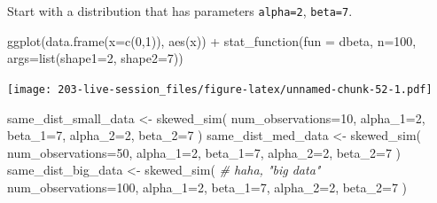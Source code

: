 \documentclass[
]{book}
\newenvironment{Shaded}{\begin{snugshade}}{\end{snugshade}}
\newcommand{\AttributeTok}[1]{\textcolor[rgb]{0.77,0.63,0.00}{#1}}
\newcommand{\CommentTok}[1]{\textcolor[rgb]{0.56,0.35,0.01}{\textit{#1}}}
\newcommand{\DecValTok}[1]{\textcolor[rgb]{0.00,0.00,0.81}{#1}}
\newcommand{\FunctionTok}[1]{\textcolor[rgb]{0.00,0.00,0.00}{#1}}
\newcommand{\NormalTok}[1]{#1}
\newcommand{\OtherTok}[1]{\textcolor[rgb]{0.56,0.35,0.01}{#1}}
\newcommand{\SpecialCharTok}[1]{\textcolor[rgb]{0.00,0.00,0.00}{#1}}
\theoremstyle{definition}
\theoremstyle{definition}
\theoremstyle{definition}
\theoremstyle{definition}
\theoremstyle{remark}
\begin{document}
Start with a distribution that has parameters \texttt{alpha=2}, \texttt{beta=7}.

\begin{Shaded}
\begin{Highlighting}[]
\FunctionTok{ggplot}\NormalTok{(}\FunctionTok{data.frame}\NormalTok{(}\AttributeTok{x=}\FunctionTok{c}\NormalTok{(}\DecValTok{0}\NormalTok{,}\DecValTok{1}\NormalTok{)), }\FunctionTok{aes}\NormalTok{(x)) }\SpecialCharTok{+} 
  \FunctionTok{stat\_function}\NormalTok{(}\AttributeTok{fun =}\NormalTok{ dbeta, }\AttributeTok{n=}\DecValTok{100}\NormalTok{, }\AttributeTok{args=}\FunctionTok{list}\NormalTok{(}\AttributeTok{shape1=}\DecValTok{2}\NormalTok{, }\AttributeTok{shape2=}\DecValTok{7}\NormalTok{))}
\end{Highlighting}
\end{Shaded}

\texttt{[image: 203-live-session\_files/figure-latex/unnamed-chunk-52-1.pdf]}

\begin{Shaded}
\begin{Highlighting}[]
\NormalTok{same\_dist\_small\_data }\OtherTok{\textless{}{-}} \FunctionTok{skewed\_sim}\NormalTok{(}
  \AttributeTok{num\_observations=}\DecValTok{10}\NormalTok{, }
  \AttributeTok{alpha\_1=}\DecValTok{2}\NormalTok{, }\AttributeTok{beta\_1=}\DecValTok{7}\NormalTok{, }
  \AttributeTok{alpha\_2=}\DecValTok{2}\NormalTok{, }\AttributeTok{beta\_2=}\DecValTok{7}
\NormalTok{  )}
\NormalTok{same\_dist\_med\_data }\OtherTok{\textless{}{-}} \FunctionTok{skewed\_sim}\NormalTok{(}
  \AttributeTok{num\_observations=}\DecValTok{50}\NormalTok{, }
  \AttributeTok{alpha\_1=}\DecValTok{2}\NormalTok{, }\AttributeTok{beta\_1=}\DecValTok{7}\NormalTok{, }
  \AttributeTok{alpha\_2=}\DecValTok{2}\NormalTok{, }\AttributeTok{beta\_2=}\DecValTok{7}
\NormalTok{  )}
\NormalTok{same\_dist\_big\_data }\OtherTok{\textless{}{-}} \FunctionTok{skewed\_sim}\NormalTok{( }\CommentTok{\# haha, "big data"}
  \AttributeTok{num\_observations=}\DecValTok{100}\NormalTok{, }
  \AttributeTok{alpha\_1=}\DecValTok{2}\NormalTok{, }\AttributeTok{beta\_1=}\DecValTok{7}\NormalTok{, }
  \AttributeTok{alpha\_2=}\DecValTok{2}\NormalTok{, }\AttributeTok{beta\_2=}\DecValTok{7}
\NormalTok{  )}
\end{Highlighting}
\end{Shaded}
\end{document}
